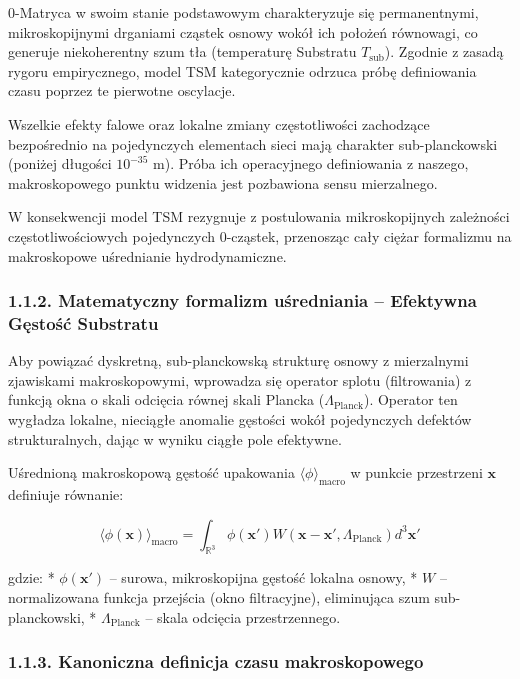 \documentclass[
  letterpaper,
  DIV=11,
  numbers=noendperiod]{scrartcl}
\numberwithin{equation}{subsection}
\begin{document}
0-Matryca w swoim stanie podstawowym charakteryzuje się permanentnymi,
mikroskopijnymi drganiami cząstek osnowy wokół ich położeń równowagi, co
generuje niekoherentny szum tła (temperaturę Substratu
\(T_{\text{sub}}\)). Zgodnie z zasadą rygoru empirycznego, model TSM
kategorycznie odrzuca próbę definiowania czasu poprzez te pierwotne
oscylacje.

Wszelkie efekty falowe oraz lokalne zmiany częstotliwości zachodzące
bezpośrednio na pojedynczych elementach sieci mają charakter
sub-planckowski (poniżej długości \(10^{-35}\) m). Próba ich
operacyjnego definiowania z naszego, makroskopowego punktu widzenia jest
pozbawiona sensu mierzalnego.

W konsekwencji model TSM rezygnuje z postulowania mikroskopijnych
zależności częstotliwościowych pojedynczych 0-cząstek, przenosząc cały
ciężar formalizmu na makroskopowe uśrednianie hydrodynamiczne.

\subsubsection{1.1.2. Matematyczny formalizm uśredniania -- Efektywna
Gęstość
Substratu}\label{matematyczny-formalizm-uux15bredniania-efektywna-gux119stoux15bux107-substratu}

Aby powiązać dyskretną, sub-planckowską strukturę osnowy z mierzalnymi
zjawiskami makroskopowymi, wprowadza się operator splotu (filtrowania) z
funkcją okna o skali odcięcia równej skali Plancka
(\(\Lambda_{\text{Planck}}\)). Operator ten wygładza lokalne, nieciągłe
anomalie gęstości wokół pojedynczych defektów strukturalnych, dając w
wyniku ciągłe pole efektywne.

Uśrednioną makroskopową gęstość upakowania
\(\langle\phi\rangle_{\text{macro}}\) w punkcie przestrzeni
\(\mathbf{x}\) definiuje równanie:

\[\langle\phi(\mathbf{x})\rangle_{\text{macro}} = \int_{\mathbb{R}^3} \phi(\mathbf{x}') W(\mathbf{x} - \mathbf{x}', \Lambda_{\text{Planck}}) d^3\mathbf{x}' \tag{1.1.1}\]

gdzie: * \(\phi(\mathbf{x}')\) -- surowa, mikroskopijna gęstość lokalna
osnowy, * \(W\) -- normalizowana funkcja przejścia (okno filtracyjne),
eliminująca szum sub-planckowski, * \(\Lambda_{\text{Planck}}\) -- skala
odcięcia przestrzennego.

\subsubsection{1.1.3. Kanoniczna definicja czasu
makroskopowego}\label{kanoniczna-definicja-czasu-makroskopowego}
\end{document}

